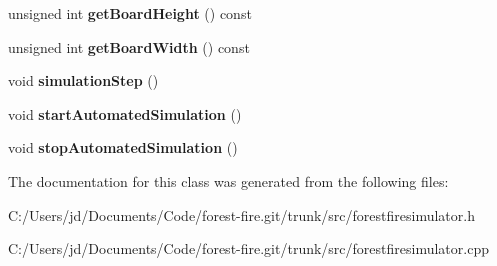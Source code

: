 \begin{DoxyCompactItemize}
\item 
unsigned int {\bfseries get\+Board\+Height} () const \hypertarget{class_forest_fire_simulator_aab07c284bc05af4602d7a7955bffd9fa}{}\label{class_forest_fire_simulator_aab07c284bc05af4602d7a7955bffd9fa}

\item 
unsigned int {\bfseries get\+Board\+Width} () const \hypertarget{class_forest_fire_simulator_a3f7eb638224b52e03f521a14c146838d}{}\label{class_forest_fire_simulator_a3f7eb638224b52e03f521a14c146838d}

\item 
void {\bfseries simulation\+Step} ()\hypertarget{class_forest_fire_simulator_ad42e3ebcd8d970c1798d089b1da1f803}{}\label{class_forest_fire_simulator_ad42e3ebcd8d970c1798d089b1da1f803}

\item 
void {\bfseries start\+Automated\+Simulation} ()\hypertarget{class_forest_fire_simulator_abfdcdcab2a2092f7af749abff6883c59}{}\label{class_forest_fire_simulator_abfdcdcab2a2092f7af749abff6883c59}

\item 
void {\bfseries stop\+Automated\+Simulation} ()\hypertarget{class_forest_fire_simulator_a296707f2f0ac431534ddbc4c2f790f3f}{}\label{class_forest_fire_simulator_a296707f2f0ac431534ddbc4c2f790f3f}

\end{DoxyCompactItemize}


The documentation for this class was generated from the following files\+:\begin{DoxyCompactItemize}
\item 
C\+:/\+Users/jd/\+Documents/\+Code/forest-\/fire.\+git/trunk/src/forestfiresimulator.\+h\item 
C\+:/\+Users/jd/\+Documents/\+Code/forest-\/fire.\+git/trunk/src/forestfiresimulator.\+cpp\end{DoxyCompactItemize}
